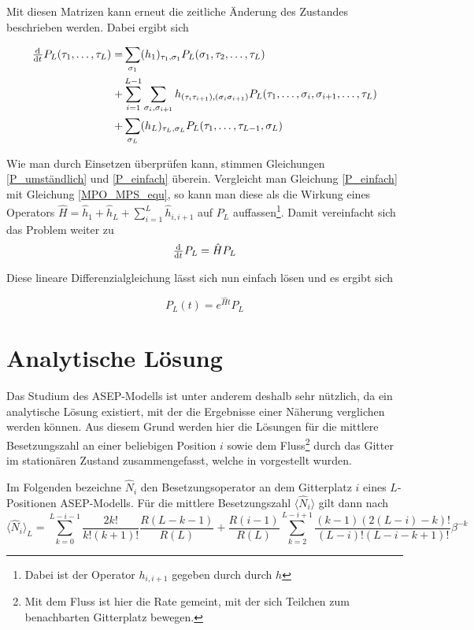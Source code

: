 \documentclass[10pt,a4paper]{report}
\begin{document}
Mit diesen Matrizen kann erneut die zeitliche Änderung des Zustandes beschrieben werden. Dabei ergibt sich

\begin{equation}\label{P_einfach}
\begin{split}
\od{}{t}P_L(\tau_1,\ldots,\tau_L) =& \sum_{\sigma_1}(h_1)_{\tau_1,\sigma_1}P_L(\sigma_1,\tau_2,\ldots,\tau_L)\\
+&\sum_{i=1}^{L-1}\sum_{\sigma_i,\sigma_{i+1}}h_{(\tau_i\tau_{i+1}),(\sigma_i\sigma_{i+1})}P_L(\tau_1,\ldots,\sigma_i,\sigma_{i+1},\ldots,\tau_L)\\
+&\sum_{\sigma_L}(h_L)_{\tau_L,\sigma_L}P_L(\tau_1,\ldots,\tau_{L-1},\sigma_L)
\end{split}
\end{equation}

Wie man durch Einsetzen überprüfen kann, stimmen Gleichungen \ref{P_umständlich} und \ref{P_einfach} überein. Vergleicht man Gleichung \ref{P_einfach} mit Gleichung \ref{MPO_MPS_equ}, so kann man diese als die Wirkung eines Operators $\hat{H}=\hat{h}_1+\hat{h}_L+\sum_{i=1}^L\hat{h}_{i,i+1}$ auf $P_L$ auffassen\footnote{Dabei ist der Operator $h_{i,i+1}$ gegeben durch durch $h$}. Damit vereinfacht sich das Problem weiter zu
\begin{equation}
\od{}{t}P_L=\hat{H}P_L
\end{equation}

Diese lineare Differenzialgleichung lässt sich nun einfach lösen und es ergibt sich

\begin{equation}\label{ASEP_solution_equ}
P_L(t)=e^{\hat{H}t}P_L
\end{equation}

\section{Analytische Lösung}

Das Studium des ASEP-Modells ist unter anderem deshalb sehr nützlich, da ein analytische Lösung existiert, mit der die Ergebnisse einer Näherung verglichen werden können. Aus diesem Grund werden hier die Lösungen für die mittlere Besetzungszahl an einer beliebigen Position $i$ sowie dem Fluss\footnote{Mit dem Fluss ist hier die Rate gemeint, mit der sich Teilchen zum benachbarten Gitterplatz bewegen.} durch das Gitter im stationären Zustand zusammengefasst, welche in \cite{ASEP} vorgestellt wurden.

Im Folgenden bezeichne $\hat{N}_i$ den Besetzungsoperator an dem Gitterplatz $i$ eines $L$-Positionen ASEP-Modells. Für die mittlere Besetzungszahl $\langle\hat{N}_i\rangle$ gilt dann nach \cite{ASEP}
\begin{equation}
\langle\hat{N}_i\rangle_L=\sum_{k=0}^{L-i-1}\frac{2k!}{k!(k+1)!}\frac{R(L-k-1)}{R(L)}+\frac{R(i-1)}{R(L)}\sum_{k=2}^{L-i+1}\frac{(k-1)(2(L-i)-k)!}{(L-i)!(L-i-k+1)!}\beta^{-k}
\end{equation}
\end{document}
